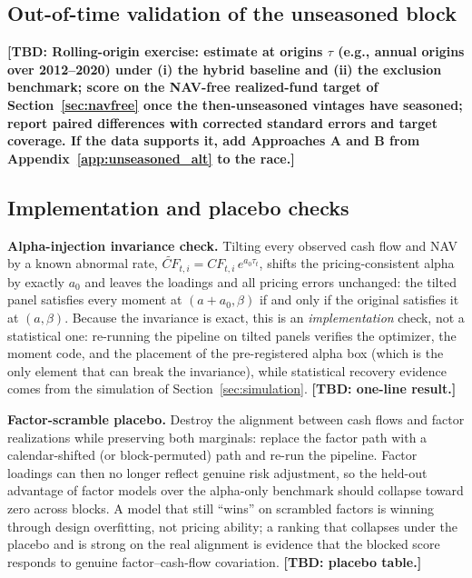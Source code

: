 \documentclass[11pt]{article}
\newcommand{\tbd}[1]{\textbf{[TBD: #1]}}
\begin{document}
\subsection{Out-of-time validation of the unseasoned block}

\tbd{Rolling-origin exercise: estimate at origins \(\tau\) (e.g., annual origins over 2012--2020) under (i) the hybrid baseline and (ii) the exclusion benchmark; score on the NAV-free realized-fund target of Section~\ref{sec:navfree} once the then-unseasoned vintages have seasoned; report paired differences with corrected standard errors and target coverage. If the data supports it, add Approaches A and B from Appendix~\ref{app:unseasoned_alt} to the race.}

\subsection{Implementation and placebo checks}
\label{sec:placebo}

\textbf{Alpha-injection invariance check.} Tilting every observed cash flow and NAV by a known abnormal rate, \(\widetilde{CF}_{t,i}=CF_{t,i}\,e^{a_0\tau_t}\), shifts the pricing-consistent alpha by exactly \(a_0\) and leaves the loadings and all pricing errors unchanged: the tilted panel satisfies every moment at \((a+a_0,\beta)\) if and only if the original satisfies it at \((a,\beta)\). Because the invariance is exact, this is an \emph{implementation} check, not a statistical one: re-running the pipeline on tilted panels verifies the optimizer, the moment code, and the placement of the pre-registered alpha box (which is the only element that can break the invariance), while statistical recovery evidence comes from the simulation of Section~\ref{sec:simulation}. \tbd{one-line result.}

\textbf{Factor-scramble placebo.} Destroy the alignment between cash flows and factor realizations while preserving both marginals: replace the factor path with a calendar-shifted (or block-permuted) path and re-run the pipeline. Factor loadings can then no longer reflect genuine risk adjustment, so the held-out advantage of factor models over the alpha-only benchmark should collapse toward zero across blocks. A model that still ``wins'' on scrambled factors is winning through design overfitting, not pricing ability; a ranking that collapses under the placebo and is strong on the real alignment is evidence that the blocked score responds to genuine factor--cash-flow covariation. \tbd{placebo table.}
\end{document}
